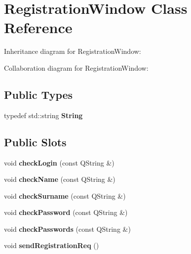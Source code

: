 \hypertarget{classRegistrationWindow}{}\section{Registration\+Window Class Reference}
\label{classRegistrationWindow}


Inheritance diagram for Registration\+Window\+:


Collaboration diagram for Registration\+Window\+:
\subsection*{Public Types}
\begin{DoxyCompactItemize}
\item 
typedef std\+::string {\bfseries String}\hypertarget{classRegistrationWindow_aaf0fe3ae606ae74a15ff07d34d6762f0}{}\label{classRegistrationWindow_aaf0fe3ae606ae74a15ff07d34d6762f0}

\end{DoxyCompactItemize}
\subsection*{Public Slots}
\begin{DoxyCompactItemize}
\item 
void {\bfseries check\+Login} (const Q\+String \&)\hypertarget{classRegistrationWindow_a054fcf4544f917e106aa6760f720d7b2}{}\label{classRegistrationWindow_a054fcf4544f917e106aa6760f720d7b2}

\item 
void {\bfseries check\+Name} (const Q\+String \&)\hypertarget{classRegistrationWindow_a26d58595ac8df47a0456878a80c45ffc}{}\label{classRegistrationWindow_a26d58595ac8df47a0456878a80c45ffc}

\item 
void {\bfseries check\+Surname} (const Q\+String \&)\hypertarget{classRegistrationWindow_a6fc9f673b5e1d2fd15c9e12bfc0174b2}{}\label{classRegistrationWindow_a6fc9f673b5e1d2fd15c9e12bfc0174b2}

\item 
void {\bfseries check\+Password} (const Q\+String \&)\hypertarget{classRegistrationWindow_a761ec197a38b335aaa5db06287361849}{}\label{classRegistrationWindow_a761ec197a38b335aaa5db06287361849}

\item 
void {\bfseries check\+Passwords} (const Q\+String \&)\hypertarget{classRegistrationWindow_a6c3761195b00134d3ef4decf91ea76e7}{}\label{classRegistrationWindow_a6c3761195b00134d3ef4decf91ea76e7}

\item 
void {\bfseries send\+Registration\+Req} ()\hypertarget{classRegistrationWindow_a4344e4dafa6ab47e564c243b20a0c7a4}{}\label{classRegistrationWindow_a4344e4dafa6ab47e564c243b20a0c7a4}

\end{DoxyCompactItemize}
